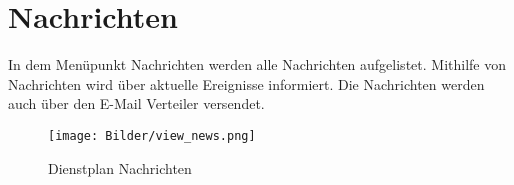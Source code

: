 \chapter{Nachrichten}
\label{cha:nachrichten}

In dem Menüpunkt Nachrichten werden alle Nachrichten aufgelistet. Mithilfe von Nachrichten wird über aktuelle Ereignisse informiert. Die Nachrichten werden auch über den E-Mail Verteiler versendet.

\begin{figure}[h]
 \begin{addmargin}{-0.2\linewidth}
   \centering 
   \texttt{[image: Bilder/view\_news.png]}
 \end{addmargin} 
 \caption[Nachrichten]{Dienstplan Nachrichten}
 \label{fig:view_news}
\end{figure}
